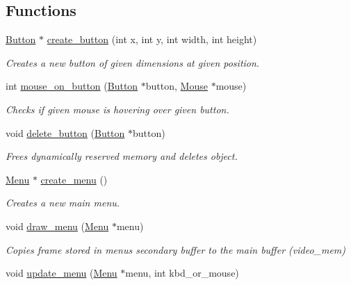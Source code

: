 \subsection*{Functions}
\begin{DoxyCompactItemize}
\item 
\hyperlink{struct_button}{Button} $\ast$ \hyperlink{group__menu_gaac1aca3c5e3ed5bccc82ccd7556138ed}{create\+\_\+button} (int x, int y, int width, int height)
\begin{DoxyCompactList}\small\item\em Creates a new button of given dimensions at given position. \end{DoxyCompactList}\item 
int \hyperlink{group__menu_ga137aca34f09e40a031dc463eab8d2050}{mouse\+\_\+on\+\_\+button} (\hyperlink{struct_button}{Button} $\ast$button, \hyperlink{struct_mouse}{Mouse} $\ast$mouse)
\begin{DoxyCompactList}\small\item\em Checks if given mouse is hovering over given button. \end{DoxyCompactList}\item 
void \hyperlink{group__menu_ga7fdafd18e6b0729fb26b435a54a072e7}{delete\+\_\+button} (\hyperlink{struct_button}{Button} $\ast$button)
\begin{DoxyCompactList}\small\item\em Frees dynamically reserved memory and deletes \textquotesingle{}object\textquotesingle{}. \end{DoxyCompactList}\item 
\hyperlink{struct_menu}{Menu} $\ast$ \hyperlink{group__menu_ga89bccdf2d8b12f81102d85e3b77d2505}{create\+\_\+menu} ()
\begin{DoxyCompactList}\small\item\em Creates a new main menu. \end{DoxyCompactList}\item 
void \hyperlink{group__menu_gabd716dc598e19aa573308e960c00cec1}{draw\+\_\+menu} (\hyperlink{struct_menu}{Menu} $\ast$menu)
\begin{DoxyCompactList}\small\item\em Copies frame stored in menu\textquotesingle{}s secondary buffer to the main buffer (video\+\_\+mem) \end{DoxyCompactList}\item 
void \hyperlink{group__menu_ga99bc2dfd43702a29bdcef45fea2f8391}{update\+\_\+menu} (\hyperlink{struct_menu}{Menu} $\ast$menu, int kbd\+\_\+or\+\_\+mouse)

\end{DoxyCompactItemize}
